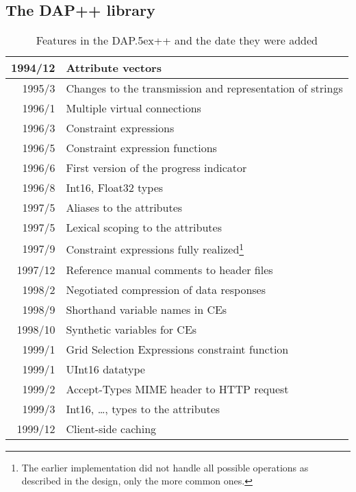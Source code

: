 \documentclass{article}
\newcommand{\dap}{\rm {\small DAP}\raise.5ex\hbox{\footnotesize ++}\xspace}
\begin{document}
\subsection{The DAP++ library}
\begin{table}[h]
\caption{Features in the \dap and the date they were added}
\label{tab:dap-features}
\begin{minipage}{\linewidth}
\begin{center}
\begin{tabular} {|rl|} \hline
1994/12 & Attribute vectors \\ \hline

1995/3 & Changes to the transmission and representation of strings \\
\hline

1996/1 &  Multiple virtual connections \\
1996/3 &   Constraint expressions \\
1996/5 &   Constraint expression functions\\
1996/6 &  First version of the progress indicator\\
1996/8 &   Int16, Float32 types\\ \hline

1997/5 &   Aliases to the attributes \\
1997/5 &   Lexical scoping to the attributes \\
1997/9 &  Constraint expressions fully realized\footnote{The earlier
  implementation did not handle all possible operations as described in the
  design, only the more common ones.} \\
1997/12 &   Reference manual comments to header files\\ \hline

1998/2 &  Negotiated compression of data responses \\
1998/9 &  Shorthand variable names in CEs \\
1998/10 & Synthetic variables for CEs \\ \hline

1999/1 &  Grid Selection Expressions constraint function \\
1999/1 &   UInt16 datatype \\
1999/2 &   Accept-Types MIME header to HTTP request \\
1999/3 &   Int16, \ldots, types to the attributes \\
1999/12 &   Client-side caching \\ \hline


\end{tabular}
\end{center}
\end{minipage}
\end{table}
\end{document}
